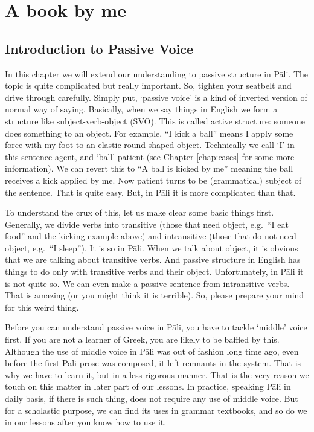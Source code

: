 \chapter{A book  by me}\label{chap:pass}

{}
\section*{Introduction to Passive Voice}

In this chapter we will extend our understanding to passive structure in P\=ali. The topic is quite complicated but really important. So, tighten your seatbelt and drive through carefully. Simply put, `passive voice' is a kind of inverted version of normal way of saying. Basically, when we say things in English we form a structure like subject-verb-object (SVO). This is called active structure: someone does something to an object. For example, ``I kick a ball'' means I apply some force with my foot to an elastic round-shaped object. Technically we call `I' in this sentence agent, and `ball' patient (see Chapter \ref{chap:cases} for some more information). We can revert this to ``A ball is kicked by me'' meaning the ball receives a kick applied by me. Now patient turns to be (grammatical) subject of the sentence. That is quite easy. But, in P\=ali it is more complicated than that.

To understand the crux of this, let us make clear some basic things first. Generally, we divide verbs into transitive (those that need object, e.g.\ ``I eat food'' and the kicking example above) and intransitive (those that do not need object, e.g.\ ``I sleep''). It is so in P\=ali. When we talk about object, it is obvious that we are talking about transitive verbs. And passive structure in English has things to do only with transitive verbs and their object. Unfortunately, in P\=ali it is not quite so. We can even make a passive sentence from intransitive verbs. That is amazing (or you might think it is terrible). So, please prepare your mind for this weird thing.

Before you can understand passive voice in P\=ali, you have to tackle `middle' voice first. If you are not a learner of Greek, you are likely to be baffled by this. Although the use of middle voice in P\=ali was out of fashion long time ago, even before the first P\=ali prose was composed, it left remnants in the system. That is why we have to learn it, but in a less rigorous manner. That is the very reason we touch on this matter in later part of our lessons. In practice, speaking P\=ali in daily basis, if there is such thing, does not require any use of middle voice. But for a scholastic purpose, we can find its uses in grammar textbooks, and so do we in our lessons after you know how to use it.

